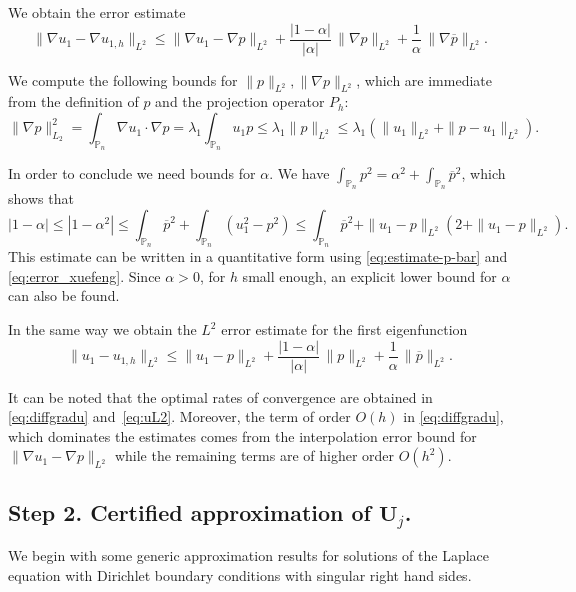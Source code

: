 \documentclass[JEP,XML,SOM,Unicode,ThmDefs,NoFloatCountersInSection,published]{cedram}
\theoremstyle{plain}
\theoremstyle{definition}
\newcommand{\bo}[1]{{\boldsymbol#1}}
\def\Pp{{\mathbb{P}_n}}
\begin{document}
We obtain the error estimate
\begin{equation}
\|\nabla u_1- \nabla u_{1,h}\|_{L^2} \le \|\nabla u_1-\nabla p\|_{L^2} + \frac{|1-\alpha|}{|\alpha |}\, \|\nabla p\|_{L^2} + \frac{1}{\alpha }\, \|\nabla \overline p \|_{L^2}.
\label{eq:diffgradu}
\end{equation}

We compute the following bounds for $\|p\|_{L^2}, \|\nabla p\|_{L^2}$, which are immediate from the definition of $p$ and the projection operator $P_h$:
\[
\| \nabla p\|_{L_2}^2 = \int_\Pp \nabla u_1 \cdot \nabla p = \lambda_1 \int_\Pp u_1p \leq \lambda_1 \|p\|_{L^2}\leq \lambda_1 (\|u_1\|_{L^2}+\|p-u_1\|_{L^2}).
\]

In order to conclude we need bounds for $\alpha$. We have $\int_\Pp p^2=\alpha^2 + \int_\Pp \overline p^2$, which shows that
\[
|1-\alpha| \leq |1-\alpha^2| \leq \int_\Pp \overline p^2 +\int_\Pp (u_1^2-p^2) \leq \int_\Pp \overline p^2 + \|u_1-p\|_{L^2}(2+\|u_1-p\|_{L^2}).
\]
This estimate can be written in a quantitative form using \eqref{eq:estimate-p-bar} and \eqref{eq:error_xuefeng}. Since $\alpha>0$, for $h$ small enough, an explicit lower bound for $\alpha$ can also be found.

In the same way we obtain the $L^2$ error estimate for the first eigenfunction
\begin{equation}
\|u_1-u_{1,h}\|_{L^2} \leq \|u_1-p\|_{L^2}+\frac{|1-\alpha|}{|\alpha|}\, \|p\|_{L^2}+\frac{1}{\alpha}\, \|\overline p\|_{L^2}.
\label{eq:uL2}
\end{equation}

It can be noted that the optimal rates of convergence are obtained in \eqref{eq:diffgradu} and~\eqref{eq:uL2}. Moreover, the term of order $O(h)$ in \eqref{eq:diffgradu}, which dominates the estimates comes from the interpolation error bound for $\|\nabla u_1-\nabla p\|_{L^2}$ while the remaining terms are of higher order $O(h^2)$.

\subsection{Step 2. Certified approximation of $\bo U_j$.}
\label{sec:estimates-U}
We begin with some generic approx\-imation results for solutions of the Laplace equation with Dirichlet boundary conditions with singular right hand sides.
\end{document}
